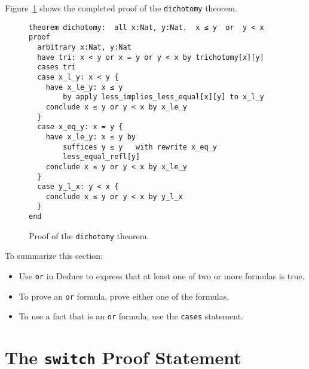 \documentclass[12pt]{article}
\begin{document}
\noindent Figure~\ref{fig:dichotomy} shows the completed proof of the
\texttt{dichotomy} theorem.

\begin{figure}[tbp]
\begin{verbatim}
theorem dichotomy:  all x:Nat, y:Nat.  x ≤ y  or  y < x
proof
  arbitrary x:Nat, y:Nat
  have tri: x < y or x = y or y < x by trichotomy[x][y]
  cases tri
  case x_l_y: x < y {
    have x_le_y: x ≤ y
        by apply less_implies_less_equal[x][y] to x_l_y
    conclude x ≤ y or y < x by x_le_y
  }
  case x_eq_y: x = y {
    have x_le_y: x ≤ y by
        suffices y ≤ y   with rewrite x_eq_y
        less_equal_refl[y]
    conclude x ≤ y or y < x by x_le_y
  }
  case y_l_x: y < x {
    conclude x ≤ y or y < x by y_l_x
  }
end
\end{verbatim}
\caption{Proof of the \texttt{dichotomy} theorem.}
\label{fig:dichotomy}
\end{figure}

To summarize this section:
\begin{itemize}
\item Use \texttt{or} in Deduce to express that at least one of two or
  more formulas is true.
\item To prove an \texttt{or} formula, prove either one of the
  formulas.
\item To use a fact that is an \texttt{or} formula, use the
  \texttt{cases} statement.
\end{itemize}

\section{The \texttt{switch} Proof Statement}
\label{sec:switch-proof}
\end{document}
